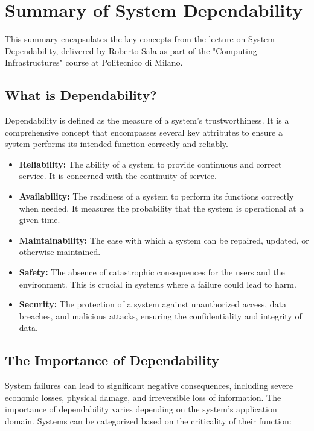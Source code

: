 \chapter{Summary of System Dependability}

This summary encapsulates the key concepts from the lecture on System Dependability, delivered by Roberto Sala as part of the "Computing Infrastructures" course at Politecnico di Milano.

\section{What is Dependability?}

Dependability is defined as the measure of a system's trustworthiness. It is a comprehensive concept that encompasses several key attributes to ensure a system performs its intended function correctly and reliably.

\begin{itemize}
    \item \textbf{Reliability:} The ability of a system to provide continuous and correct service. It is concerned with the continuity of service.
    \item \textbf{Availability:} The readiness of a system to perform its functions correctly when needed. It measures the probability that the system is operational at a given time.
    \item \textbf{Maintainability:} The ease with which a system can be repaired, updated, or otherwise maintained.
    \item \textbf{Safety:} The absence of catastrophic consequences for the users and the environment. This is crucial in systems where a failure could lead to harm.
    \item \textbf{Security:} The protection of a system against unauthorized access, data breaches, and malicious attacks, ensuring the confidentiality and integrity of data.
\end{itemize}

\section{The Importance of Dependability}

System failures can lead to significant negative consequences, including severe economic losses, physical damage, and irreversible loss of information. The importance of dependability varies depending on the system's application domain. Systems can be categorized based on the criticality of their function:

